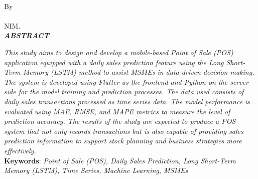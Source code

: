 \clearpage
{}
{}
\begin{center}
    \textbf{\large{\MakeUppercase{\judulen}}}\\[0.5cm]
    By\\
    \textbf{\penulis}\\
    NIM. \textbf{\nim}\\[2em]
    \textbf{\textit{ABSTRACT}}\\[0.5cm]
\end{center}

\textit{This study aims to design and develop a mobile-based Point of Sale (POS) application equipped with a daily sales prediction feature using the Long Short-Term Memory (LSTM) method to assist MSMEs in data-driven decision-making. The system is developed using Flutter as the frontend and Python on the server side for the model training and prediction processes. The data used consists of daily sales transactions processed as time series data. The model performance is evaluated using MAE, RMSE, and MAPE metrics to measure the level of prediction accuracy. The results of the study are expected to produce a POS system that not only records transactions but is also capable of providing sales prediction information to support stock planning and business strategies more effectively.}\\[0.6cm]

\noindent \textbf{Keywords}: \textit{Point of Sale (POS), Daily Sales Prediction, Long Short-Term Memory (LSTM), Time Series, Machine Learning, MSMEs}
